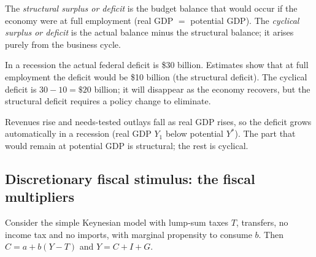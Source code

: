 \begin{definition}
The \emph{structural surplus or deficit} is the budget balance that would occur if the
economy were at full employment (real GDP $=$ potential GDP). The \emph{cyclical surplus
or deficit} is the actual balance minus the structural balance; it arises purely from the
business cycle.
\end{definition}

\begin{example}
In a recession the actual federal deficit is \$30 billion. Estimates show that at full
employment the deficit would be \$10 billion (the structural deficit). The cyclical deficit
is $30 - 10 = \$20$ billion; it will disappear as the economy recovers, but the structural
deficit requires a policy change to eliminate.
\end{example}

\begin{center}
\end{center}
Revenues rise and needs-tested outlays fall as real GDP rises, so the deficit grows
automatically in a recession (real GDP $Y_1$ below potential $Y^{*}$). The part that would remain at potential GDP is structural;
the rest is cyclical.

\subsection{Discretionary fiscal stimulus: the fiscal multipliers}

Consider the simple Keynesian model with lump-sum taxes $T$, transfers, no income tax and
no imports, with marginal propensity to consume $b$. Then $C = a + b(Y - T)$ and
$Y = C + I + G$.

